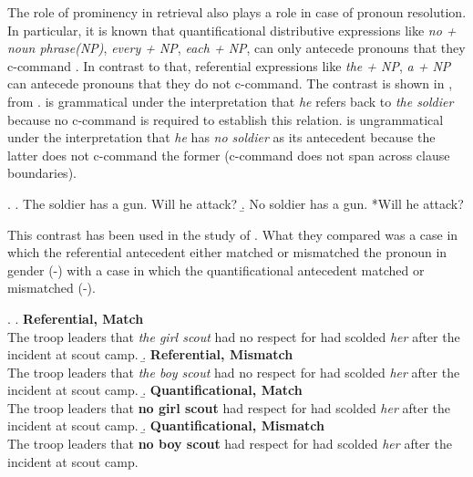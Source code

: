 \documentclass[11pt]{article} %
\newcommand{\dependent}[1]{\textit{#1}}
\newcommand{\antecedent}[1]{\textit{#1}}
\newcommand{\distractor}[1]{\textbf{#1}}
\newcommand{\cond}[1]{\textbf{#1}}
\begin{document}
The role of prominency in retrieval also plays a role in case of pronoun resolution. In particular, it is known that quantificational distributive expressions like \textit{no + noun phrase(NP)}, \textit{every + NP}, \textit{each + NP}, can only antecede pronouns that they c-command \citep{heim82, reinhart83}. In contrast to that, referential expressions like \textit{the + NP}, \textit{a + NP} can antecede pronouns that they do not c-command. The contrast is shown in \Next, from \citep{heim82}. \Next[a] is grammatical under the interpretation that \textit{he} refers back to \textit{the soldier} because no c-command is required to establish this relation. \Next[b] is ungrammatical under the interpretation that \textit{he} has \textit{no soldier} as its antecedent because the latter does not c-command the former (c-command does not span across clause boundaries).

\ex. \a. The soldier has a gun. Will he attack?
\b. No soldier has a gun. *Will he attack?


This contrast has been used in the study of \cite{kush+15}. What they compared was a case in which the referential antecedent either matched or mismatched the pronoun in gender (\Next[a]-\Next[b]) with a case in which the quantificational antecedent matched or mismatched (\Next[c]-\Next[d]).

\ex.
    \a. \cond{Referential, Match}\\
    The troop leaders that \antecedent{the girl scout} had no respect for had scolded \dependent{her} after the incident at scout camp.
    \b. \cond{Referential, Mismatch}\\
    The troop leaders that \antecedent{the boy scout} had no respect for had scolded \dependent{her} after the incident at scout camp.
    \b. \cond{Quantificational, Match}\\
    The troop leaders that \distractor{no girl scout} had respect for had scolded \dependent{her} after the incident at scout camp.
    \b. \cond{Quantificational, Mismatch}\\
    The troop leaders that \distractor{no boy scout} had respect for had scolded \dependent{her} after the incident at scout camp.
\end{document}
